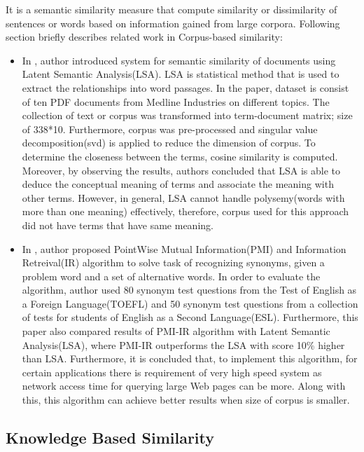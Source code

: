 \documentclass{article}
\begin{document}
\begin{flushleft}
It is a semantic similarity measure that compute similarity or dissimilarity of sentences or words based on information gained from large corpora. Following section briefly describes related work in Corpus-based similarity: 
\end{flushleft}

\begin{itemize}
\item In \cite{lsa}, author introduced system for semantic similarity of documents using Latent Semantic Analysis(LSA). LSA is statistical method that is used to extract the relationships into word passages. In the paper, dataset is consist of ten PDF documents from Medline Industries on different topics. The collection of text or corpus was transformed into term-document matrix; size of 338*10. Furthermore, corpus was pre-processed and singular value decomposition(svd) is applied to reduce the dimension of corpus. To determine the closeness between the terms, cosine similarity is computed. Moreover, by observing the results, authors concluded that LSA is able to deduce the conceptual meaning of terms and associate the meaning with other terms. However, in general, LSA cannot handle polysemy(words with more than one meaning) effectively, therefore, corpus used for this approach did not have terms that have same meaning.
\item In \cite{PMI}, author proposed PointWise Mutual Information(PMI) and Information Retreival(IR) algorithm to solve task of recognizing synonyms, given a problem word and a set of alternative words. In order to evaluate the algorithm, author used 80 synonym test questions from the Test of English as a Foreign Language(TOEFL) and 50 synonym test questions from a collection of tests for students of English as a Second Language(ESL). Furthermore, this paper also compared results of PMI-IR algorithm with Latent Semantic Analysis(LSA), where PMI-IR outperforms the LSA with score 10\% higher than LSA. Furthermore, it is concluded that, to implement this algorithm, for certain applications there is requirement of very high speed system as network access time for querying large Web pages can be more. Along with this, this algorithm can achieve better results when size of corpus is smaller.    
\end{itemize}
\begin{flushleft}
\subsection{Knowledge Based Similarity}
\end{flushleft}
\end{document}
